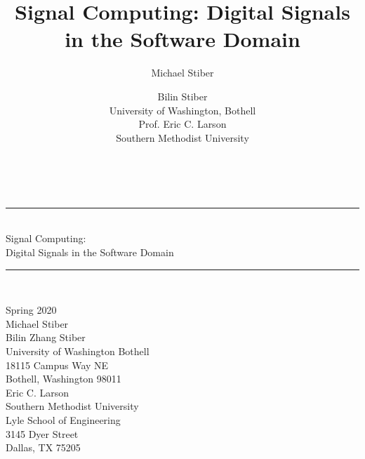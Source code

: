 \documentclass[12pt]{book}
\title{Signal Computing: Digital Signals in the Software Domain}
\author{Michael Stiber \and Bilin Stiber\\ 
{\normalsize University of Washington, Bothell}\\
{\normalsize Prof. Eric C. Larson}\\
{\normalsize Southern Methodist University}}
\makeatletter
\def\vhrulefill#1{\leavevmode\leaders\hrule\@height#1\hfill \kern\z@}
\makeatother
\begin{document}
\begin{titlepage}

%
\mbox{}\\[0.5in]
\begin{center}
\begin{bfseries}
\mbox{}\vhrulefill{2pt}\mbox{}\\[0.25in]
{\Huge Signal Computing:}\\[0.25in]
{\LARGE Digital Signals in the Software Domain}\\[0.25in]
\mbox{}\vhrulefill{2pt}\mbox{}\\[3in]
\end{bfseries}

\mbox{}\hfill
\parbox{1.5in}{\mbox{}}
\parbox{3in}{\raggedright
Spring 2020\\[0.25in]
Michael Stiber\\
Bilin Zhang Stiber\\
University of Washington Bothell\\
18115 Campus Way NE\\
Bothell, Washington 98011\\[0.25in]
Eric C. Larson\\
Southern Methodist University\\
Lyle School of Engineering\\
3145 Dyer Street\\
Dallas, TX 75205}
\end{center}




\end{titlepage}
\end{document}

